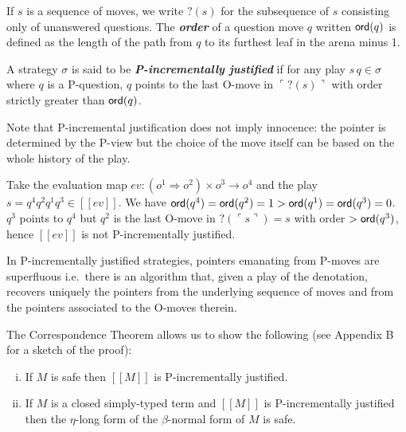 \documentclass{llncs}
\newcommand\defname[1]{{\bf\em #1}\index{#1}}
\newcommand{\sem}[1]{{[\![ #1 ]\!]}}
\newcommand{\pview}[1]{\ulcorner #1 \urcorner}
\begin{document}
If $s$ is a sequence of moves, we write $?(s)$ for the subsequence of
$s$ consisting only of unanswered questions. The \defname{order} of a
question move $q$ written ${\sf ord}(q)$ is defined as the length of the
path from $q$ to its furthest leaf in the arena minus 1.

\begin{definition}\rm
  A strategy $\sigma$ is said to be \defname{P-incrementally
    justified} if for any play $s \, q \in \sigma$ where $q$ is a
  P-question, $q$ points to the last O-move in $\pview{?(s)}$ with
  order strictly greater than ${\sf ord}(q)$.
\end{definition}
Note that P-incremental justification does not imply innocence: the
pointer is determined by the P-view but the choice of the move itself
can be based on the whole history of the play.
\begin{example}
  Take the evaluation map $ev : (o^1 \Rightarrow o^2) \times o^3
  \rightarrow o^4$ and the play $s = q^4 q^2 q^1 q^3 \in \sem{ev}$. We
  have ${\sf ord}(q^4) = {\sf ord}(q^2) = 1 > {\sf ord}(q^1) = {\sf ord}(q^3) = 0$.  $q^3$
  points to $q^4$ but $q^2$ is the last O-move in $?(\pview{s})= s$
  with order $>{\sf ord}(q^3)$, hence $\sem{ev}$ is not
  P-incrementally justified.
\end{example}

\begin{lemma}
  \label{lem:incrjustified_pointers_uniqu_recover} In P-incrementally
  justified strategies, pointers emanating from P-moves are
  superfluous i.e.\ there is an algorithm that, given a play of the
  denotation, recovers uniquely the pointers from the underlying
  sequence of moves and from the pointers associated to the O-moves
  therein.
\end{lemma}


The Correspondence Theorem allows us to show the following (see
Appendix B for a sketch of the proof):

\begin{theorem}
\label{thm:safeincrejust}
\begin{enumerate}[(i)]
\item If $M$ is safe then $\sem{M}$ is P-incrementally justified.
\item If $M$ is a closed simply-typed term and $\sem{M}$ is
  P-incrementally justified then the $\eta$-long form of the
  $\beta$-normal form of $M$ is safe.
\end{enumerate}
\end{theorem}
\end{document}

